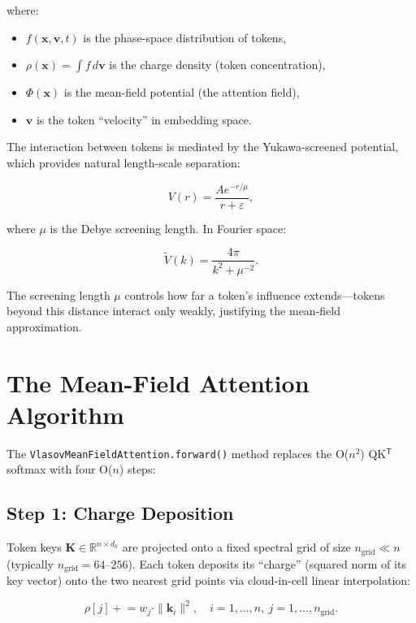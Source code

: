 \documentclass[11pt,a4paper,openright]{book}
\begin{document}
where:
\begin{itemize}
	\item $f(\mathbf{x}, \mathbf{v}, t)$ is the phase-space distribution of tokens,
	\item $\rho(\mathbf{x}) = \int f\,d\mathbf{v}$ is the charge density (token concentration),
	\item $\Phi(\mathbf{x})$ is the mean-field potential (the attention field),
	\item $\mathbf{v}$ is the token ``velocity'' in embedding space.
\end{itemize}

The interaction between tokens is mediated by the Yukawa-screened potential, which provides natural length-scale separation:

\begin{equation}
	\label{eq:yukawa_potential}
	V(r) = \frac{A e^{-r/\mu}}{r + \varepsilon},
\end{equation}

where $\mu$ is the Debye screening length. In Fourier space:

\begin{equation}
	\label{eq:yukawa_fourier}
	\tilde{V}(k) = \frac{4\pi}{k^2 + \mu^{-2}}.
\end{equation}

The screening length $\mu$ controls how far a token's influence extends---tokens beyond this distance interact only weakly, justifying the mean-field approximation.

\section{The Mean-Field Attention Algorithm}

The \texttt{VlasovMeanFieldAttention.forward()} method replaces the O($n^2$) QK$^\mathsf{T}$ softmax with four O($n$) steps:

\subsection{Step 1: Charge Deposition}

Token keys $\mathbf{K} \in \mathbb{R}^{n \times d_k}$ are projected onto a fixed spectral grid of size $n_\text{grid} \ll n$ (typically $n_\text{grid} = 64$--$256$). Each token deposits its ``charge'' (squared norm of its key vector) onto the two nearest grid points via cloud-in-cell linear interpolation:

\begin{equation}
	\label{eq:charge_dep}
	\rho[j] \mathrel{+}= w_j \cdot \|\mathbf{k}_i\|^2, \quad i = 1,\ldots,n, \ j = 1,\ldots,n_\text{grid}.
\end{equation}
\end{document}
